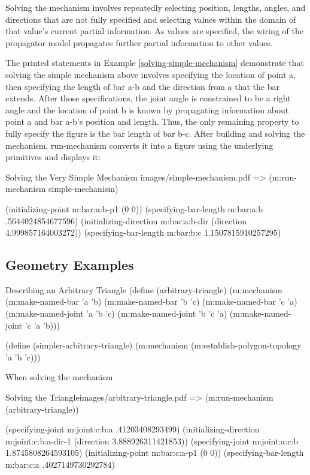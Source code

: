 Solving the mechanism involves repeatedly selecting position, lengths,
angles, and directions that are not fully specified and selecting
values within the domain of that value's current partial
information. As values are specified, the wiring of the propagator
model propagates further partial information to other values.

The printed statements in Example \ref{solving-simple-mechanism}
demonstrate that solving the simple mechanism above involves
specifying the location of point a, then specifying the length of bar
a-b and the direction from a that the bar extends. After those
specifications, the joint angle is constrained to be a right angle and
the location of point b is known by propagating information about
point a and bar a-b's position and length. Thus, the only remaining
property to fully specify the figure is the bar length of bar
b-c. After building and solving the mechanism, run-mechanism converts
it into a figure using the underlying primitives and displays it:

\begin{pdf-example}
[label=solving-simple-mechanism]
{Solving the Very Simple Mechanism}
{images/simple-mechanism.pdf}
=> (m:run-mechanism simple-mechanism)

(initializing-point m:bar:a:b-p1 (0 0))
(specifying-bar-length m:bar:a:b .5644024854677596)
(initializing-direction m:bar:a:b-dir (direction 4.999857164003272))
(specifying-bar-length m:bar:b:c 1.1507815910257295)
\end{pdf-example}

\subsection{Geometry Examples}

\begin{code-example}
[label=arbitrary-tri]
{Describing an Arbitrary Triangle}
(define (arbitrary-triangle)
  (m:mechanism
   (m:make-named-bar 'a 'b)
   (m:make-named-bar 'b 'c)
   (m:make-named-bar 'c 'a)
   (m:make-named-joint 'a 'b 'c)
   (m:make-named-joint 'b 'c 'a)
   (m:make-named-joint 'c 'a 'b)))

(define (simpler-arbitrary-triangle)
  (m:mechanism
   (m:establish-polygon-topology 'a 'b 'c)))
\end{code-example}

When solving the mechanism

\begin{pdf-example}
[label=run-arbitrary-tri]
{Solving the Triangle}{images/arbitrary-triangle.pdf}
=> (m:run-mechanism (arbitrary-triangle))

(specifying-joint m:joint:c:b:a .41203408293499)
(initializing-direction m:joint:c:b:a-dir-1 (direction 3.888926311421853))
(specifying-joint m:joint:a:c:b 1.8745808264593105)
(initializing-point m:bar:c:a-p1 (0 0))
(specifying-bar-length m:bar:c:a .4027149730292784)
\end{pdf-example}


